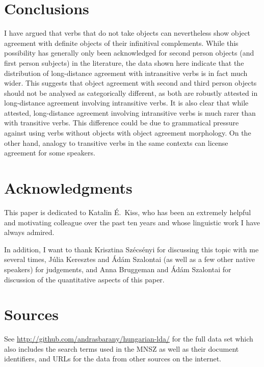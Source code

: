 \section{Conclusions}\label{sec:conclusions}

I have argued that verbs that do not take \Acc{} objects can nevertheless show
object agreement with definite \Acc{} objects of their infinitival complements.
While this possibility has generally only been acknowledged for second person
objects (and first person subjects) in the literature, the data shown here
indicate that the distribution of long-distance agreement with intransitive
verbs is in fact much wider.
%
This suggests that object agreement with second and third person objects should
not be analysed as categorically different, as both are robustly attested in
long-distance agreement involving intransitive verbs.
%
It is also clear that while attested, long-distance agreement involving
intransitive verbs is much rarer than with transitive verbs. This difference
could be due to grammatical pressure against using verbs without \Acc{} objects
with object agreement morphology. On the other hand, analogy to transitive
verbs in the same contexts can license agreement for some speakers.

\section*{Acknowledgments}

This paper is dedicated to Katalin É.\ Kiss, who has been an extremely helpful
and motivating colleague over the past ten years and whose linguistic work I
have always admired.

In addition, I want to thank Krisztina Szécsényi for discussing this topic with
me several times, Júlia Keresztes and Ádám Szalontai (as well as a few other
native speakers) for judgements, and Anna Bruggeman and Ádám Szalontai for
discussion of the quantitative aspects of this paper.

\newrefcontext[sorting=nyt]
\printbibliography

\appendix

\section{Sources}\label{app:sources}

See \url{http://github.com/andrasbarany/hungarian-lda/} for the full data set
which also includes the search terms used in the \gls{MNSZ} as well as their
document identifiers, and URLs for the data from other sources on the internet.

